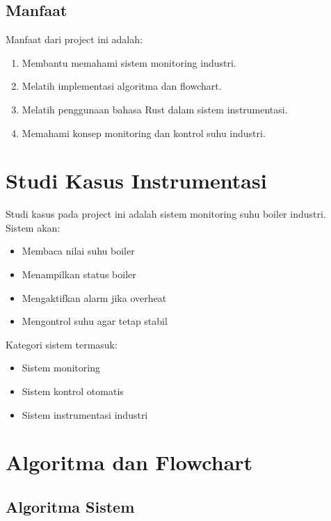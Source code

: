 \documentclass[a4paper,12pt]{article}
\begin{document}
\subsection{Manfaat}
Manfaat dari project ini adalah:
\begin{enumerate}
    \item Membantu memahami sistem monitoring industri.
    \item Melatih implementasi algoritma dan flowchart.
    \item Melatih penggunaan bahasa Rust dalam sistem instrumentasi.
    \item Memahami konsep monitoring dan kontrol suhu industri.
\end{enumerate}


\section{Studi Kasus Instrumentasi}

Studi kasus pada project ini adalah sistem monitoring suhu boiler industri.\\

Sistem akan:
\begin{itemize}
    \item Membaca nilai suhu boiler
    \item Menampilkan status boiler
    \item Mengaktifkan alarm jika overheat
    \item Mengontrol suhu agar tetap stabil
\end{itemize}

Kategori sistem termasuk:
\begin{itemize}
    \item Sistem monitoring
    \item Sistem kontrol otomatis
    \item Sistem instrumentasi industri
\end{itemize}


\section{Algoritma dan Flowchart}

\subsection{Algoritma Sistem}
\end{document}
